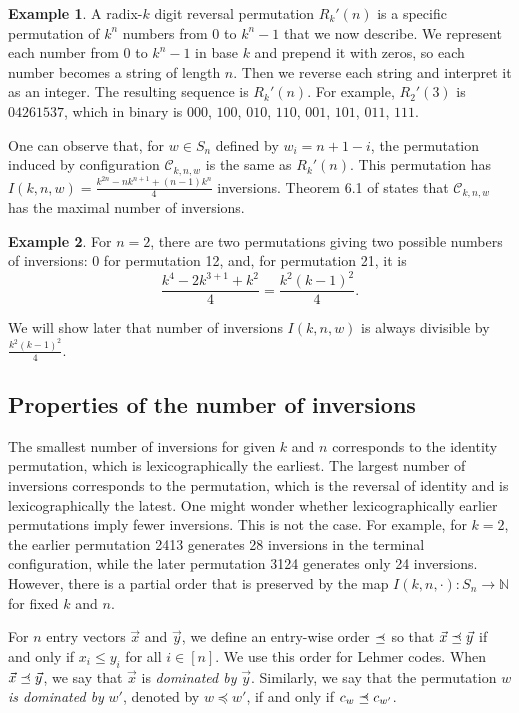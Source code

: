 \documentclass[final]{dmtcs-episciences}
\theoremstyle{definition}
\newtheorem{example}{Example}
\theoremstyle{remark}
\newcommand\preceqdot{\mathrel{\ooalign{$\preceq$\cr
\hidewidth\raise0.225ex\hbox{$\cdot\mkern0.5mu$}\cr}}}
\begin{document}
\begin{example}\label{ex:Radixk}
A radix-$k$ digit reversal permutation $R_k'(n)$ is a specific permutation of $k^n$ numbers from $0$ to $k^n-1$ that we now describe. We represent each number from $0$ to $k^n -1$ in base $k$ and prepend it with zeros, so each number becomes a string of length $n$. Then we reverse each string and interpret it as an integer. The resulting sequence is $R_k'(n)$. For example, $R_2'(3)$ is $04261537$, which in binary is $000$, $100$, $010$, $110$, $001$, $101$, $011$, $111$. 

One can observe that, for $w \in S_n$ defined by $w_i= n+1-i$, the permutation induced by configuration $\mathcal{C}_{k, n, w}$ is the same as $R_k'(n)$. This permutation has $I(k, n, w) = \frac{k^{2n}-nk^{n+1} + (n-1)k^n}{4}
$ inversions. Theorem 6.1 of \cite{MR4887467} states that $\mathcal{C}_{k, n, w}$ has the maximal number of inversions.
\end{example}

\begin{example}
    For $n=2$, there are two permutations giving two possible numbers of inversions: 0 for permutation 12, and, for permutation 21, it is 
    \[\frac{k^{4}-2k^{3+1}+k^2}{4} = \frac{k^{2}(k-1)^2}{4}.\]
\end{example}

We will show later that number of inversions $I(k,n,w)$ is always divisible by $\frac{k^{2}(k-1)^2}{4}$.

\subsection{Properties of the number of inversions}

The smallest number of inversions for given $k$ and $n$ corresponds to the identity permutation, which is lexicographically the earliest. The largest number of inversions corresponds to the permutation, which is the reversal of identity and is lexicographically the latest. One might wonder whether lexicographically earlier permutations imply fewer inversions. This is not the case. For example, for $k=2$, the earlier permutation 2413 generates 28 inversions in the terminal configuration, while the later permutation 3124 generates only 24 inversions. However, there is a partial order that is preserved by the map $I(k, n, \cdot): S_n \to \mathbb{N}$ for fixed $k$ and $n$. 

For $n$ entry vectors $\vec{x}$ and $\vec{y}$, we define an entry-wise order $\preceqdot$ so that $\vec{x} \preceqdot \vec{y}$ if and only if $x_i \leq y_i$ for all $i \in [n]$. We use this order for Lehmer codes. When $\vec{x} \preceqdot \vec{y}$, we say that $\vec{x}$ is \textit{dominated by} $\vec{y}$. Similarly, we say that the permutation $w$ \textit{is dominated by} $w'$, denoted by $w \preceq w'$, if and only if $c_w \preceqdot c_{w'}$.
\end{document}
